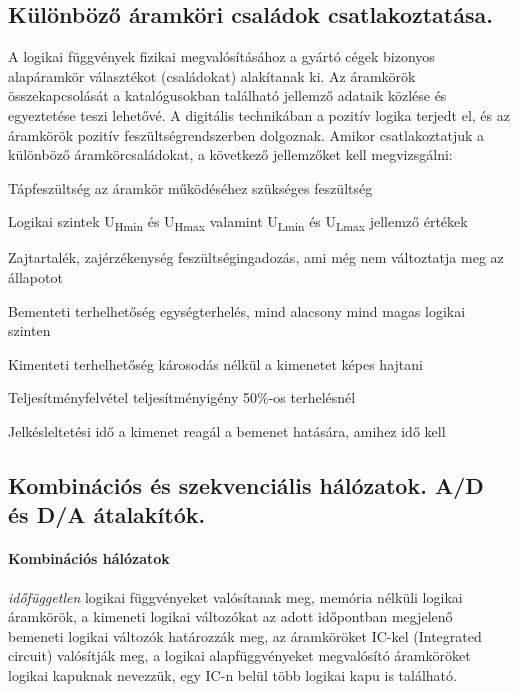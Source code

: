 \subsection{Különböző áramköri családok csatlakoztatása.}
A logikai függvények fizikai megvalósításához a gyártó cégek bizonyos alapáramkör választékot (családokat) alakítanak ki. Az áramkörök összekapcsolását a katalógusokban található jellemző adataik közlése és egyeztetése teszi lehetővé. A digitális technikában a pozitív logika terjedt el, és az áramkörök pozitív feszültségrendszerben dolgoznak. Amikor
csatlakoztatjuk a különböző áramkörcsaládokat, a következő jellemzőket kell megvizsgálni:
\begin{enumdescript}
	\item[Tápfeszültség] az áramkör működéséhez szükséges feszültség
	\item[Logikai szintek] U\textsubscript{Hmin} és U\textsubscript{Hmax} valamint U\textsubscript{Lmin} és U\textsubscript{Lmax} jellemző értékek
	\item[Zajtartalék, zajérzékenység] feszültségingadozás, ami még nem változtatja meg az állapotot
	\item[Bementeti terhelhetőség] egységterhelés, mind alacsony mind magas logikai szinten
	\item[Kimenteti terhelhetőség] károsodás nélkül a kimenetet képes hajtani
	\item[Teljesítményfelvétel] teljesítményigény 50\%-os terhelésnél
	\item[Jelkésleltetési idő] a kimenet reagál a bemenet hatására, amihez idő kell
\end{enumdescript}

\subsection{Kombinációs és szekvenciális hálózatok. A/D és D/A átalakítók.}
\paragraph{Kombinációs hálózatok} \emph{időfüggetlen} logikai függvényeket valósítanak meg, memória nélküli logikai áramkörök, a kimeneti logikai változókat az adott időpontban megjelenő bemeneti logikai változók határozzák meg, az áramköröket IC-kel (Integrated circuit) valósítják meg, a logikai alapfüggvényeket megvalósító áramköröket logikai kapuknak nevezzük, egy IC-n belül több logikai kapu is található.

